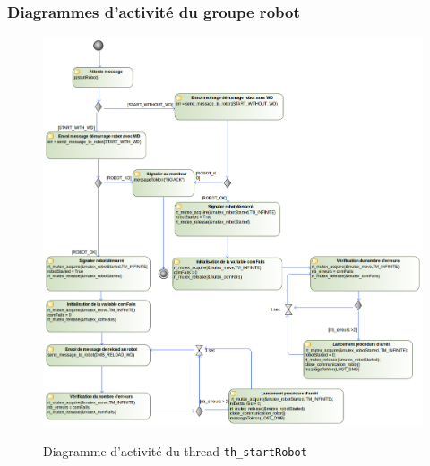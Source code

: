 \documentclass[11pt, a4paper]{paper}
\begin{document}
\subsubsection{Diagrammes d'activité du groupe robot}

\begin{figure}[H]
\label{fig:th_startRobot}
\begin{center}
{\includegraphics[width=1.0\textwidth]{./figures-pdf/th_startRobot}}
{\caption{Diagramme d'activité du thread {\tt th\_startRobot}}}
\end{center}
\end{figure}
\end{document}
